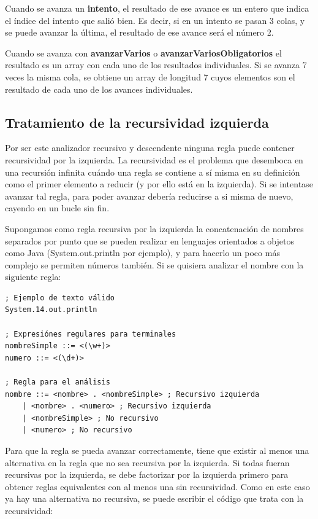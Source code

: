 \documentclass{report}
\begin{document}
	\vspace{10px}
	
	Cuando se avanza un \textbf{intento}, el resultado de ese avance es un entero que indica el índice del intento que salió bien. Es decir, si en un intento se pasan 3 colas, y se puede avanzar la última, el resultado de ese avance será el número 2. 
	
	\vspace{10px}
	
	Cuando se avanza con \textbf{avanzarVarios} o \textbf{avanzarVariosObligatorios} el resultado es un array con cada uno de los resultados individuales. Si se avanza 7 veces la misma cola, se obtiene un array de longitud 7 cuyos elementos son el resultado de cada uno de los avances individuales. 
	

	\subsection{Tratamiento de la recursividad izquierda}
	
	Por ser este analizador recursivo y descendente ninguna regla puede contener recursividad por la izquierda. La recursividad es el problema que desemboca en una recursión infinita cuándo una regla se contiene a sí misma en su definición como el primer elemento a reducir (y por ello está en la izquierda). Si se intentase avanzar tal regla, para poder avanzar debería reducirse a si misma de nuevo, cayendo en un bucle sin fin.
	
	Supongamos como regla recursiva por la izquierda la concatenación de nombres separados por punto que se pueden realizar en lenguajes orientados a objetos como Java (System.out.println por ejemplo), y para hacerlo un poco más complejo se permiten números también. Si se quisiera analizar el nombre con la siguiente regla:
	
	
\begin{BVerbatim}
; Ejemplo de texto válido 
System.14.out.println

; Expresiónes regulares para terminales
nombreSimple ::= <(\w+)>
numero ::= <(\d+)>

; Regla para el análisis
nombre ::= <nombre> . <nombreSimple> ; Recursivo izquierda
	| <nombre> . <numero> ; Recursivo izquierda
	| <nombreSimple> ; No recursivo
	| <numero> ; No recursivo
\end{BVerbatim}	

	Para que la regla se pueda avanzar correctamente, tiene que existir al menos una alternativa en la regla que no sea recursiva por la izquierda. Si todas fueran recursivas por la izquierda, se debe factorizar por la izquierda primero para obtener reglas equivalentes con al menos una sin recursividad\cite{conflictoll3}. Como en este caso ya hay una alternativa no recursiva, se puede escribir el código que trata con la recursividad:
	
\end{document}
